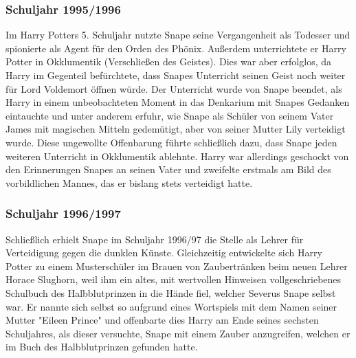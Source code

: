 \documentclass[a4paper, 10pt]{article}
\begin{document}
\subsubsection*{Schuljahr     1995/1996}
Im Harry Potters 5. Schuljahr nutzte Snape seine Vergangenheit als Todesser und spionierte als Agent für den Orden des Phönix. Außerdem unterrichtete er Harry Potter in Okklumentik (Verschließen des Geistes). Dies war aber erfolglos, da Harry im Gegenteil befürchtete, dass Snapes Unterricht seinen Geist noch weiter für Lord Voldemort öffnen würde. Der Unterricht wurde von Snape beendet, als Harry in einem unbeobachteten Moment in das Denkarium mit Snapes Gedanken eintauchte und unter anderem erfuhr, wie Snape als Schüler von seinem Vater James mit magischen Mitteln gedemütigt, aber von seiner Mutter Lily verteidigt wurde. Diese ungewollte Offenbarung führte schließlich dazu, dass Snape jeden weiteren Unterricht in Okklumentik ablehnte. Harry war allerdings geschockt von den Erinnerungen Snapes an seinen Vater und zweifelte erstmals am Bild des vorbildlichen Mannes, das er bislang stets verteidigt hatte.

\subsubsection*{Schuljahr 1996/1997}
Schließlich erhielt Snape im Schuljahr 1996/97 die Stelle als Lehrer für Verteidigung gegen die dunklen Künste. Gleichzeitig entwickelte sich Harry Potter zu einem Musterschüler im Brauen von Zaubertränken beim neuen Lehrer Horace Slughorn, weil ihm ein altes, mit wertvollen Hinweisen vollgeschriebenes Schulbuch des Halbblutprinzen in die Hände fiel, welcher Severus Snape selbst war. Er nannte sich selbst so aufgrund eines Wortspiels mit dem Namen seiner Mutter "Eileen Prince" und offenbarte dies Harry am Ende seines sechsten Schuljahres, als dieser versuchte, Snape mit einem Zauber anzugreifen, welchen er im Buch des Halbblutprinzen gefunden hatte.
\vspace{10pt}
\newline
{}  
\end{document}
